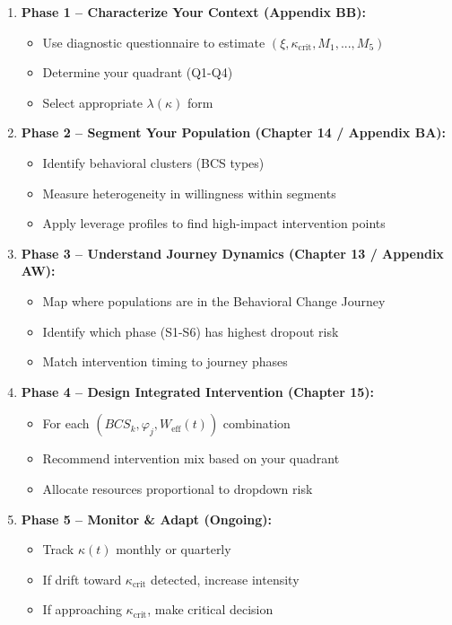 \documentclass[11pt, a4paper]{article}
\begin{document}
\begin{enumerate}
    \item \textbf{Phase 1 – Characterize Your Context (Appendix BB):}
    \begin{itemize}
        \item Use diagnostic questionnaire to estimate $(\xi, \kappa_{\text{crit}}, M_1,...,M_5)$
        \item Determine your quadrant (Q1-Q4)
        \item Select appropriate $\lambda(\kappa)$ form
    \end{itemize}

    \item \textbf{Phase 2 – Segment Your Population (Chapter 14 / Appendix BA):}
    \begin{itemize}
        \item Identify behavioral clusters (BCS types)
        \item Measure heterogeneity in willingness within segments
        \item Apply leverage profiles to find high-impact intervention points
    \end{itemize}

    \item \textbf{Phase 3 – Understand Journey Dynamics (Chapter 13 / Appendix AW):}
    \begin{itemize}
        \item Map where populations are in the Behavioral Change Journey
        \item Identify which phase (S1-S6) has highest dropout risk
        \item Match intervention timing to journey phases
    \end{itemize}

    \item \textbf{Phase 4 – Design Integrated Intervention (Chapter 15):}
    \begin{itemize}
        \item For each $(BCS_k, \varphi_j, W_{\text{eff}}(t))$ combination
        \item Recommend intervention mix based on your quadrant
        \item Allocate resources proportional to dropdown risk
    \end{itemize}

    \item \textbf{Phase 5 – Monitor \& Adapt (Ongoing):}
    \begin{itemize}
        \item Track $\kappa(t)$ monthly or quarterly
        \item If drift toward $\kappa_{\text{crit}}$ detected, increase intensity
        \item If approaching $\kappa_{\text{crit}}$, make critical decision
    \end{itemize}
\end{enumerate}
\end{document}
